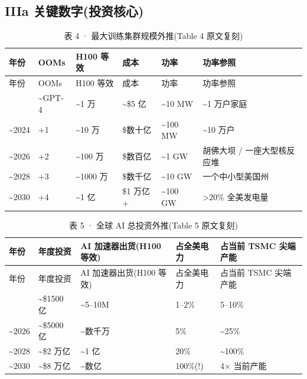 \subsection{IIIa 关键数字(投资核心)}\label{iiia-ux5173ux952eux6570ux5b57ux6295ux8d44ux6838ux5fc3}

\begin{longtable}[]{@{}llllll@{}}
\caption{表 4 · 最大训练集群规模外推(Table 4 原文复刻)}\tabularnewline
\toprule\noalign{}
年份 & OOMs & H100 等效 & 成本 & 功率 & 功率参照 \\
\midrule\noalign{}
\endfirsthead
\toprule\noalign{}
年份 & OOMs & H100 等效 & 成本 & 功率 & 功率参照 \\
\midrule\noalign{}
\endhead
\bottomrule\noalign{}
\endlastfoot
2022 & \textasciitilde GPT-4 & \textasciitilde1 万 & \textasciitilde\$5 亿 & \textasciitilde10 MW & \textasciitilde1 万户家庭 \\
\textasciitilde2024 & +1 & \textasciitilde10 万 & \$数十亿 & \textasciitilde100 MW & \textasciitilde10 万户 \\
\textasciitilde2026 & +2 & \textasciitilde100 万 & \$数百亿 & \textasciitilde1 GW & 胡佛大坝 / 一座大型核反应堆 \\
\textasciitilde2028 & +3 & \textasciitilde1000 万 & \$数千亿 & \textasciitilde10 GW & 一个中小型美国州 \\
\textasciitilde2030 & +4 & \textasciitilde1 亿 & \$1 万亿+ & \textasciitilde100 GW & \textgreater20\% 全美发电量 \\
\end{longtable}

\begin{longtable}[]{@{}lllll@{}}
\caption{表 5 · 全球 AI 总投资外推(Table 5 原文复刻)}\tabularnewline
\toprule\noalign{}
年份 & 年度投资 & AI 加速器出货(H100 等效) & 占全美电力 & 占当前 TSMC 尖端产能 \\
\midrule\noalign{}
\endfirsthead
\toprule\noalign{}
年份 & 年度投资 & AI 加速器出货(H100 等效) & 占全美电力 & 占当前 TSMC 尖端产能 \\
\midrule\noalign{}
\endhead
\bottomrule\noalign{}
\endlastfoot
2024 & \textasciitilde\$1500 亿 & \textasciitilde5--10M & 1--2\% & 5--10\% \\
\textasciitilde2026 & \textasciitilde\$5000 亿 & \textasciitilde 数千万 & 5\% & \textasciitilde25\% \\
\textasciitilde2028 & \textasciitilde\$2 万亿 & \textasciitilde1 亿 & 20\% & \textasciitilde100\% \\
\textasciitilde2030 & \textasciitilde\$8 万亿 & \textasciitilde 数亿 & 100\%(!) & 4× 当前产能 \\
\end{longtable}

